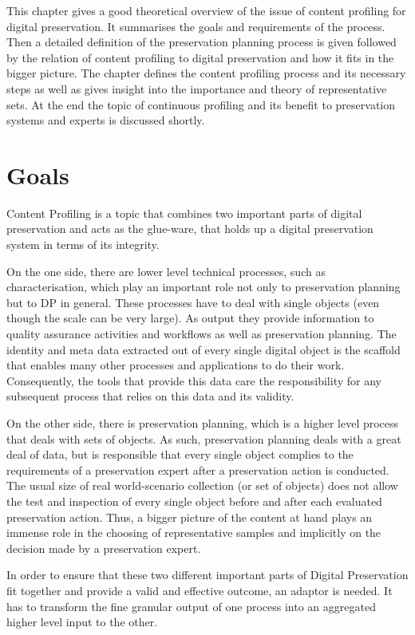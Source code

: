 This chapter gives a good theoretical overview of the issue of content profiling for digital preservation. It summarises the goals and requirements of the process. Then a detailed definition of the preservation planning process is given followed by the relation of content profiling to digital preservation and how it fits in the bigger picture. The chapter defines the content profiling process and its necessary steps as well as gives insight into the importance and theory of representative sets. At the end the topic of continuous profiling and its benefit to preservation systems and experts is discussed shortly.

\section {Goals}
\label{sec:goals}
Content Profiling is a topic that combines two important parts of digital preservation and acts as the glue-ware, that holds up a digital preservation system in terms of its integrity.

On the one side, there are lower level technical processes, such as characterisation, which play an important role not only to preservation planning but to DP in general. These processes have to deal with single objects (even though the scale can be very large). As output they provide information to quality assurance activities and workflows as well as preservation planning. The identity and meta data extracted out of every single digital object is the scaffold that enables many other processes and applications to do their work. Consequently, the tools that provide this data care the responsibility for any subsequent process that relies on this data and its validity.

On the other side, there is preservation planning, which is a higher level process that deals with sets of objects. As such, preservation planning deals with a great deal of data, but is responsible that every single object complies to the requirements of a preservation expert after a preservation action is conducted. The usual size of real world-scenario collection (or set of objects) does not allow the test and inspection of every single object before and after each evaluated preservation action. Thus, a bigger picture of the content at hand plays an immense role in the choosing of representative samples and implicitly on the decision made by a preservation expert.

In order to ensure that these two different important parts of Digital Preservation fit together and provide a valid and effective outcome, an adaptor is needed. It has to transform the fine granular output of one process into an aggregated higher level input to the other.


